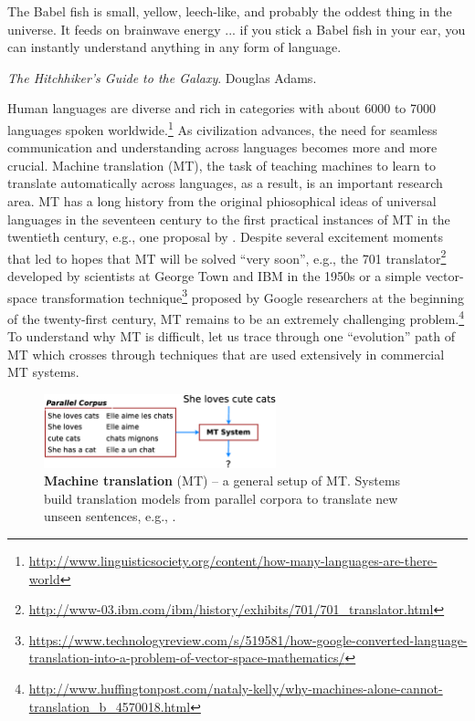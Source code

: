 \epigraph{The Babel fish is small, yellow, leech-like, and probably the oddest
thing in the universe. It feeds on brainwave energy  ...
if you stick a Babel fish in your ear, you can
instantly understand anything in any form of language.}{{\it The Hitchhiker's
Guide to the Galaxy}.
Douglas Adams.}
Human languages are diverse and rich in categories with about 6000 to 7000
languages spoken worldwide.\footnote{\url{http://www.linguisticsociety.org/content/how-many-languages-are-there-world}}
As civilization advances, the need for seamless communication and understanding across
languages becomes more and more crucial. Machine translation (MT), the
task of teaching machines to learn to translate automatically across languages, as
a result, is an important research area.
MT has a long history \cite{hutchins07} from the original
phiosophical ideas of universal languages in the seventeen century to the 
first practical instances of MT in the twentieth century, e.g., one proposal by
. Despite several excitement moments that led to hopes that MT
will be solved ``very soon'', e.g., the 701 translator\footnote{\url{http://www-03.ibm.com/ibm/history/exhibits/701/701_translator.html}}
developed by scientists at George Town and IBM in the 1950s or a simple
vector-space transformation
technique\footnote{\url{https://www.technologyreview.com/s/519581/how-google-converted-language-translation-into-a-problem-of-vector-space-mathematics/}} proposed by Google researchers at the beginning of the twenty-first
century,
MT remains to be an extremely challenging
problem.\footnote{\url{http://www.huffingtonpost.com/nataly-kelly/why-machines-alone-cannot-translation_b_4570018.html}}
To understand why MT is difficult, let us trace through one ``evolution''
path of %
MT which crosses through techniques that are used extensively in
commercial MT systems. 

\begin{figure}
\centering
\includegraphics[width=0.6\textwidth, clip=true, trim= 0 0 0 0]{img/mt} %
\caption{{\bf Machine translation} (MT) -- a general setup of MT. Systems
build translation models from parallel corpora to translate new unseen
sentences, e.g., .}
\label{f:mt}
\end{figure}

